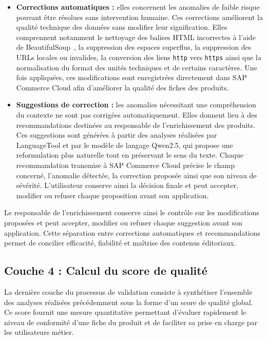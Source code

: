 \begin{itemize}
    \item \textbf{Corrections automatiques :} elles concernent les anomalies de faible risque pouvant être résolues sans intervention humaine. Ces corrections améliorent la qualité technique des données sans modifier leur signification. Elles comprennent notamment le nettoyage des balises HTML incorrectes à l'aide de BeautifulSoup~\cite{beautifulsoup}, la suppression des espaces superflus, la suppression des URLs locales ou invalides, la conversion des liens \texttt{http} vers \texttt{https} ainsi que la normalisation du format des unités techniques et de certains caractères. Une fois appliquées, ces modifications sont enregistrées directement dans SAP Commerce Cloud afin d'améliorer la qualité des fiches des produits.

    \item \textbf{Suggestions de correction :} les anomalies nécessitant une compréhension du contexte ne sont pas corrigées automatiquement. Elles donnent lieu à des recommandations destinées au responsable de l'enrichissement des produits. Ces suggestions sont générées à partir des analyses réalisées par LanguageTool et par le modèle de langage Qwen2.5, qui propose une reformulation plus naturelle tout en préservant le sens du texte. Chaque recommandation transmise à SAP Commerce Cloud précise le champ concerné, l'anomalie détectée, la correction proposée ainsi que son niveau de sévérité. L'utilisateur conserve ainsi la décision finale et peut accepter, modifier ou refuser chaque proposition avant son application.
\end{itemize}

Le responsable de l'enrichissement conserve ainsi le contrôle sur les modifications proposées et peut accepter, modifier ou refuser chaque suggestion avant son application. Cette séparation entre corrections automatiques et recommandations permet de concilier efficacité, fiabilité et maîtrise des contenus éditoriaux.
\newpage
\subsection{Couche 4 : Calcul du score de qualité}

La dernière couche du processus de validation consiste à synthétiser l'ensemble des analyses réalisées précédemment sous la forme d'un score de qualité global. Ce score fournit une mesure quantitative permettant d'évaluer rapidement le niveau de conformité d'une fiche du produit et de faciliter sa prise en charge par les utilisateurs métier.

